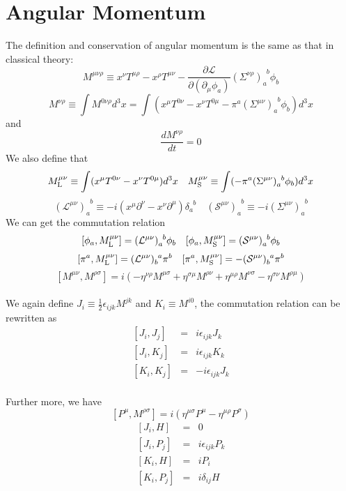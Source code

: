 \section{Angular Momentum}
\noindent
The definition and conservation of angular momentum is the same as that in classical theory:
\[M^{\mu \nu \rho} \equiv x^{\nu}T^{\mu \rho} - x^{\rho} T^{\mu \nu} - \frac{\partial \mathcal{L}}{\partial (\partial_{\mu}\phi_a)}(\Sigma^{\nu \rho})_{a}^{\phantom{a}b}\phi_b\]
\[M^{\nu \rho} \equiv \int M^{0 \nu \rho} d^3 x = \int (x^{\mu}T^{0\nu}-x^{\nu}T^{0\mu}-\pi^a(\Sigma^{\mu \nu})_{a}^{\phantom{a}b}\phi_b) d^3 x\]
and
\[\frac{dM^{\nu \rho}}{dt} = 0\]
We also define that
\[M_{\rm L}^{\mu \nu} \equiv \int (x^{\mu}T^{0\nu}-x^{\nu}T^{0\mu}) d^3 x \quad M_{\rm S}^{\mu \nu} \equiv\int (-\pi^a(\Sigma^{\mu \nu})_{a}^{\phantom{a}b}\phi_b) d^3 x\]
\[(\mathcal{L}^{\mu \nu})_a^{\phantom{a}b} \equiv -i(x^{\mu}\partial^{\nu}-x^{\nu}\partial^{\mu})\delta_a^{\phantom{a}b} \quad (\mathcal{S}^{\mu \nu})_a^{\phantom{a}b} \equiv -i(\Sigma^{\mu \nu})_a^{\phantom{a}b}\]
We can get the commutation relation
\[[\phi_a,M_{\rm L}^{\mu \nu}] = (\mathcal{L}^{\mu \nu})_a^{\phantom{a}b} \phi_b \quad [\phi_a,M_{\rm S}^{\mu \nu}] = (\mathcal{S}^{\mu \nu})_a^{\phantom{a}b} \phi_b\]
\[[\pi^a,M_{\rm L}^{\mu \nu}] = (\mathcal{L}^{\mu \nu})_b^{\phantom{b}a}\pi^{b}  \quad [\pi^a,M_{\rm S}^{\mu \nu}] = - (\mathcal{S}^{\mu \nu})_b^{\phantom{b}a} \pi^b \]
\[[M^{\mu \nu},M^{\rho \sigma}] = i(-\eta^{\nu \rho}M^{\mu \sigma} + \eta^{\sigma \mu}M^{\rho \nu} + \eta^{\mu \rho}M^{\nu \sigma} - \eta^{\sigma \nu}M^{\rho \mu})\] \\
We again define $J_i \equiv \frac{1}{2} \epsilon_{ijk} M^{jk}$ and $K_i \equiv M^{i0}$, the commutation relation can be rewritten as
\begin{eqnarray}
\left[J_i,J_j\right] &=& i\epsilon_{ijk}J_k \nonumber \\
\left[J_i,K_j\right] &=& i\epsilon_{ijk}K_k \nonumber \\
\left[K_i,K_j\right] &=& -i\epsilon_{ijk}J_k \nonumber
\end{eqnarray} \\
Further more, we have
\[[P^{\mu},M^{\rho \sigma}] = i(\eta^{\mu \sigma}P^{\mu} - \eta^{\mu \rho}P^{\sigma})\]
\begin{eqnarray}
\left[J_i,H\right] &=& 0 \nonumber \\
\left[J_i,P_j\right] &=& i\epsilon_{ijk}P_k \nonumber \\
\left[K_i,H\right] &=& iP_i \nonumber \\
\left[K_i,P_j\right] &=& i\delta_{ij}H \nonumber
\end{eqnarray}
